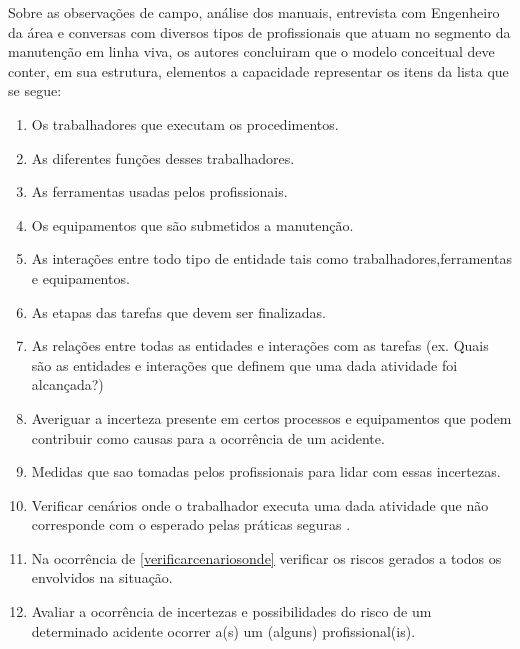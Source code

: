 Sobre as observações de campo, análise dos manuais, entrevista com Engenheiro da área e conversas com diversos tipos de profissionais que atuam no segmento da manutenção em linha viva, os autores concluiram que o modelo conceitual deve conter, em sua estrutura, elementos a capacidade representar os itens da lista que se segue:
\begin{enumerate}
	\item Os trabalhadores que executam os procedimentos.
	\item As diferentes funções desses trabalhadores.
	\item As ferramentas usadas pelos profissionais.
	\item Os equipamentos que são submetidos a manutenção.
	\item As interações entre todo tipo de entidade tais como trabalhadores,ferramentas e equipamentos.
	\item As etapas das tarefas que devem ser finalizadas. 
	\item As relações entre todas as entidades e interações com as tarefas (ex. Quais são as entidades e interações que definem que uma dada atividade foi alcançada?)
	\item Averiguar a incerteza presente em certos processos e equipamentos que podem contribuir como causas para a ocorrência de um acidente.
	\item Medidas que sao tomadas pelos profissionais para lidar com essas incertezas.
	\item Verificar cenários onde o trabalhador executa uma dada atividade que não corresponde com o esperado pelas práticas seguras \label{verificarcenariosonde}. 
	\item Na ocorrência de \ref{verificarcenariosonde} verificar os riscos gerados a todos os envolvidos na situação.
	\item Avaliar a ocorrência de incertezas e possibilidades do risco de um determinado acidente ocorrer a(s) um (alguns) profissional(is). 
\end{enumerate}